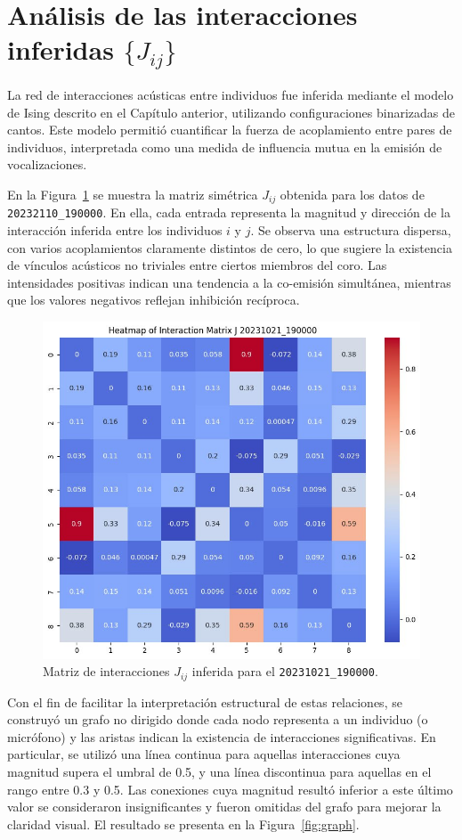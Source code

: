 \section{Análisis de las interacciones inferidas \(\{J_{ij}\}\)}
\label{sec:res_interacciones}


La red de interacciones acústicas entre individuos fue inferida 
mediante el modelo de Ising descrito en el Capítulo anterior, 
utilizando configuraciones binarizadas de cantos. 
Este modelo permitió 
cuantificar la fuerza de acoplamiento entre pares de individuos, 
interpretada como una medida de influencia mutua en la emisión 
de vocalizaciones. 

En la Figura~\ref{fig:jij} se muestra la matriz simétrica 
\( J_{ij} \) obtenida para los datos de \texttt{20232110\_190000}. 
En ella, cada entrada 
representa la magnitud y dirección de la interacción inferida 
entre los individuos \( i \) y \( j \). Se observa una 
estructura dispersa, con varios acoplamientos claramente 
distintos de cero, lo que sugiere la existencia de vínculos 
acústicos no triviales entre ciertos miembros del coro. Las 
intensidades positivas indican una tendencia a la co-emisión 
simultánea, mientras que los valores negativos reflejan 
inhibición recíproca.

\begin{figure}[htbp]
    \centering
    \includegraphics[width=0.7\linewidth]{Graphics/matrix_jij.jpg}
    \caption{Matriz de interacciones \( J_{ij} \) inferida para el \texttt{20231021\_190000}.}
    \label{fig:jij}
\end{figure}

Con el fin de facilitar la interpretación estructural de estas 
relaciones, se construyó un grafo no dirigido donde cada nodo 
representa a un individuo (o micrófono) y las aristas indican 
la existencia de interacciones significativas. En particular, 
se utilizó una línea continua para aquellas interacciones cuya 
magnitud supera el umbral de 0.5, y una línea discontinua para 
aquellas en el rango entre 0.3 y 0.5. Las conexiones cuya 
magnitud resultó inferior a este último valor se consideraron 
insignificantes y fueron omitidas del grafo para mejorar la 
claridad visual. El resultado se presenta en la 
Figura~\ref{fig:graph}.

